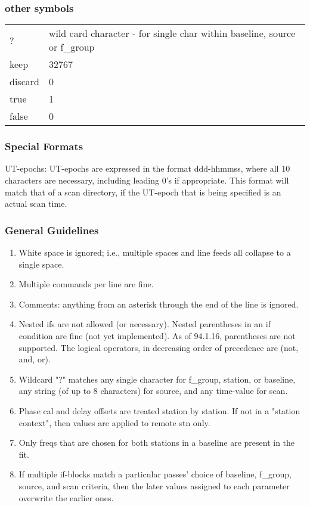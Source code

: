 \subsubsection{other symbols}
\begin{tabular}{ll}
   ?       & wild card character - for single char within baseline, source or f\_group \\
   keep    & 32767 \\
   discard &     0 \\
   true    &     1 \\
   false   &     0 \\
\end{tabular}
   


\subsubsection{Special Formats}
   UT-epochs:  UT-epochs are expressed in the format ddd-hhmmss, where all 10
           characters are necessary, including leading 0's if
           appropriate.  This format will match that of a scan directory,
           if the UT-epoch that is being specified is an actual scan time.


\subsubsection{General Guidelines}
\begin{enumerate}
\item White space is ignored; i.e., multiple spaces and line feeds all
      collapse to a single space.
\item Multiple commands per line are fine.
\item Comments: anything from an asterisk through the end of the line is ignored.
\item Nested ifs are not allowed (or necessary). Nested parentheses in
      an if condition are fine (not yet implemented).
      As of 94.1.16, parentheses are not supported. The logical operators,
      in decreasing order of precedence are (not, and, or).
\item Wildcard "?" matches any single character for f\_group, station, or
      baseline, any string (of up to 8 characters) for source, and any
      time-value for scan.
\item Phase cal and delay offsets are treated station by station. If not
      in a "station context", then values are applied to remote stn only.
\item Only freqs that are chosen for both stations in a baseline are 
      present in the fit.
\item If multiple if-blocks match a particular passes' choice of baseline,
      f\_group, source, and scan criteria, then the later values assigned
      to each parameter overwrite the earlier ones.
\end{enumerate}

